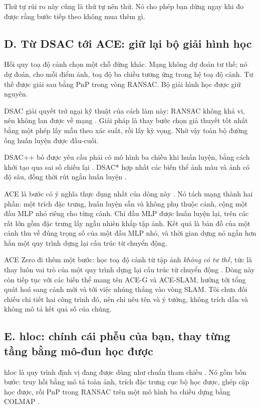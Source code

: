 \documentclass[../../deep_learning.tex]{subfiles}
\begin{document}
Thứ tự rủi ro này cũng là thứ tự nên thử. Nó cho phép bạn dừng ngay khi đo được rằng bước tiếp theo không mua thêm gì.

\subsection{D. Từ DSAC tới ACE: giữ lại bộ giải hình học}
Hồi quy toạ độ cảnh chọn một chỗ đứng khác. Mạng không dự đoán tư thế; nó dự đoán, cho mỗi điểm ảnh, toạ độ ba chiều tương ứng trong hệ toạ độ cảnh. Tư thế được giải sau bằng PnP trong vòng RANSAC. Bộ giải hình học được giữ nguyên.

DSAC giải quyết trở ngại kỹ thuật của cách làm này: RANSAC không khả vi, nên không lan được  về mạng \cite{f29brachmann2017dsac}. Giải pháp là thay bước chọn giả thuyết tốt nhất bằng một phép lấy mẫu theo xác suất, rồi lấy kỳ vọng. Nhờ vậy toàn bộ đường ống huấn luyện được đầu-cuối.

DSAC++ bỏ được yêu cầu phải có mô hình ba chiều khi huấn luyện, bằng cách khởi tạo qua sai số chiếu lại \cite{f29brachmann2018learning}. DSAC* hợp nhất các biến thể ảnh màu và ảnh có độ sâu, đồng thời rút ngắn huấn luyện \cite{f29brachmann2021visual}.

ACE là bước có ý nghĩa thực dụng nhất của dòng này \cite{f29brachmann2023accelerated}. Nó tách mạng thành hai phần: một  trích đặc trưng, huấn luyện sẵn và không phụ thuộc cảnh, cộng một đầu MLP nhỏ riêng cho từng cảnh. Chỉ đầu MLP được huấn luyện lại, trên các  rất lớn gồm đặc trưng lấy ngẫu nhiên khắp tập ảnh. Kết quả là bản đồ của một cảnh thu về đúng trọng số của một đầu MLP nhỏ, và thời gian dựng nó ngắn hơn hẳn một quy trình dựng lại cấu trúc từ chuyển động.

ACE Zero đi thêm một bước: học toạ độ cảnh từ tập ảnh \emph{không có tư thế}, tức là thay luôn vai trò của một quy trình dựng lại cấu trúc từ chuyển động \cite{f29brachmann2024scene}. Dòng này còn tiếp tục với các biến thể mang tên ACE-G và ACE-SLAM, hướng tới tổng quát hoá sang cảnh mới và tới việc nhúng thẳng vào vòng SLAM. Tôi chưa đối chiếu chi tiết hai công trình đó, nên chỉ nêu tên và ý tưởng, không trích dẫn và không mô tả kết quả số của chúng.

\subsection{E. hloc: chính cái phễu của bạn, thay từng tầng bằng mô-đun học được}
hloc là quy trình định vị đang được dùng như chuẩn tham chiếu \cite{f29sarlin2019coarse}. Nó gồm bốn bước: truy hồi bằng mô tả toàn ảnh, trích đặc trưng cục bộ học được, ghép cặp học được, rồi PnP trong RANSAC trên một mô hình ba chiều dựng bằng COLMAP \cite{schoenberger2016colmap}.
\end{document}
